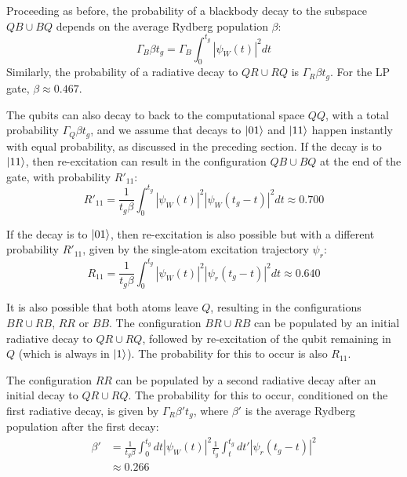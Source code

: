 \documentclass[%
reprint,
superscriptaddress,
 amsmath,amssymb,
 aps,
 prx,
floatfix,
]{revtex4-1}
\begin{document}
Proceeding as before, the probability of a blackbody decay to the subspace $QB \cup BQ$ depends on the average Rydberg population $\beta$:
\begin{equation}
    \Gamma_B \beta t_g = \Gamma_B \int_0^{t_g} \left|\psi_W(t)\right|^2 dt
\end{equation}
Similarly, the probability of a radiative decay to $QR \cup RQ$ is $\Gamma_R \beta t_g$. For the LP gate, $\beta \approx 0.467$. 

The qubits can also decay to back to the computational space $QQ$, with a total probability $\Gamma_Q \beta t_g$, and we assume that decays to $\ket{01}$ and $\ket{11}$ happen instantly with equal probability, as discussed in the preceding section. If the decay is to $\ket{11}$, then re-excitation can result in the configuration $QB \cup BQ$ at the end of the gate, with probability $R'_{11}$:
\begin{equation}
    R'_{11} = \frac{1}{t_g \beta} \int_0^{t_g} \left|\psi_W(t)\right|^2 \left|\psi_W(t_g-t)\right|^2 dt \approx 0.700
\end{equation}

If the decay is to $\ket{01}$, then re-excitation is also possible but with a different probability $R'_{11}$, given by the single-atom excitation trajectory $\psi_r$:
\begin{equation}
    R_{11} = \frac{1}{t_g \beta} \int_0^{t_g} \left|\psi_W(t)\right|^2 \left|\psi_r(t_g-t)\right|^2 dt \approx 0.640
\end{equation}

It is also possible that both atoms leave $Q$, resulting in the configurations $BR \cup RB$, $RR$ or $BB$. The configuration $BR \cup RB$ can be populated by an initial radiative decay to $QR \cup RQ$, followed by re-excitation of the qubit remaining in $Q$ (which is always in $\ket{1}$). The probability for this to occur is also $R_{11}$.

The configuration $RR$ can be populated by a second radiative decay after an initial decay to $QR \cup RQ$. The probability for this to occur, conditioned on the first radiative decay, is given by $\Gamma_R \beta' t_g$, where $\beta'$ is the average Rydberg population after the first decay:
\begin{equation}
\begin{split}
    \beta' &= \frac{1}{t_g \beta} \int_0^{t_g} dt \left|\psi_W(t)\right|^2 \frac{1}{t_g} \int_t^{t_g} dt' \left|\psi_r(t_g-t)\right|^2 \\
    &\approx 0.266
\end{split}
\end{equation}
\end{document}
